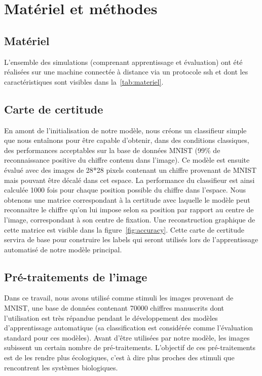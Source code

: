 
\chapter{Matériel et méthodes} %
\label{Materiel_methode} %

\section{Matériel}
L'ensemble des simulations (comprenant apprentissage et évaluation) ont été réalisées sur une machine connectée à distance via un protocole ssh et dont les caractéristiques sont visibles dans la~\autoref{tab:materiel}.

\section{Carte de certitude}
En amont de l'initialisation de notre modèle, nous créons un classifieur simple que nous entaînons pour être capable d'obtenir, dans des conditions classiques, des performances acceptables sur la base de données MNIST (99\% de reconnaissance positive du chiffre contenu dans l'image).
Ce modèle est ensuite évalué avec des images de 28*28 pixels contenant un chiffre provenant de MNIST mais pouvant être décalé dans cet espace.
La performance du classifieur est ainsi calculée 1000 fois pour chaque position possible du chiffre dans l'espace. 
Nous obtenons une matrice correspondant à la certitude avec laquelle le modèle peut reconnaitre le chiffre qu'on lui impose selon sa position par rapport au centre de l'image, correspondant à son centre de fixation.
Une reconstruction graphique de cette matrice est visible dans la figure~\ref{fig:accuracy}.
Cette carte de certitude servira de base pour construire les labels qui seront utilisés lors de l'apprentissage automatisé de notre modèle principal.

\section{Pré-traitements de l'image}
Dans ce travail, nous avons utilisé comme stimuli les images provenant de MNIST, une base de données contenant 70000 chiffres manuscrits dont l'utilisation est très répandue pendant le développement des modèles d'apprentissage automatique (sa classification est considérée comme l'évaluation standard pour ces modèles).
Avant d'être utilisées par notre modèle, les images subissent un certain nombre de pré-traitements. 
L'objectif de ces pré-traitements est de les rendre plus écologiques, c'est à dire plus proches des stimuli que rencontrent les systèmes biologiques.

